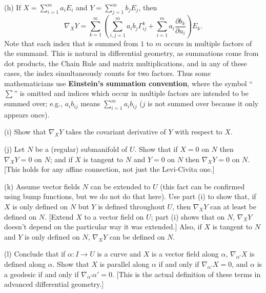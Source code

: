 \documentclass[leqno]{book}
\begin{document}
\begin{enumerate}
(h) If $X=\sum_{i=1}^m a_iE_i$ and $Y=\sum_{j=1}^m b_jE_j$, then
$$\nabla_XY=\sum_{k=1}^m\left(\sum_{i,j=1}^ma_ib_j\Gamma_{ij}^k+\sum_{i=1}^ma_i\frac{\partial b_k}{\partial u_i}\right)E_k.$$
Note that each index that is summed from $1$ to $m$ occurs in multiple factors of the summand.  This is natural in differential geometry, as summations come from dot products, the Chain Rule and matrix multiplications, and in any of these cases, the index simultaneously counts for two factors.  Thus some mathematicians use \textbf{Einstein's summation convention}, where the symbol ``$\sum$'' is omitted and indices which occur in multiple factors are intended to be summed over; e.g., $a_ib_{ij}$ means $\sum_{i=1}^ma_ib_{ij}$ ($j$ is not summed over because it only appears once).

(i) Show that $\nabla_XY$ takes the covariant derivative of $Y$ with respect to $X$.

(j) Let $N$ be a (regular) submanifold of $U$.  Show that if $X=0$ on $N$ then $\nabla_XY=0$ on $N$; and if $X$ is tangent to $N$ and $Y=0$ on $N$ then $\nabla_XY=0$ on $N$.  [This holds for any affine connection, not just the Levi-Civita one.]

(k) Assume vector fields $N$ can be extended to $U$ (this fact can be confirmed using bump functions, but we do not do that here).  Use part (i) to show that, if $X$ is only defined on $N$ but $Y$ is defined throughout $U$, then $\nabla_XY$ can at least be defined on $N$.  [Extend $X$ to a vector field on $U$; part (i) shows that on $N$, $\nabla_XY$ doesn't depend on the particular way it was extended.]  Also, if $X$ is tangent to $N$ and $Y$ is only defined on $N$, $\nabla_XY$ can be defined on $N$.

(l) Conclude that if $\alpha:I\to U$ is a curve and $X$ is a vector field along $\alpha$, $\nabla_{\alpha'}X$ is defined along $\alpha$.  Show that $X$ is parallel along $\alpha$ if and only if $\nabla_{\alpha'}X=0$, and $\alpha$ is a geodesic if and only if $\nabla_{\alpha'}\alpha'=0$.  [This is the actual definition of these terms in advanced differential geometry.]
\end{enumerate}
\end{document}
